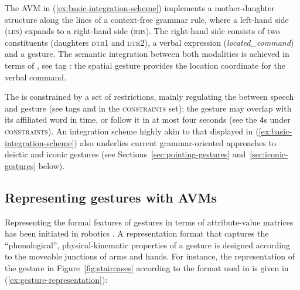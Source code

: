\documentclass[output=paper,biblatex,babelshorthands,newtxmath,draftmode,colorlinks,citecolor=brown]{langscibook}
\begin{document}
\noindent The AVM in (\ref{ex:basic-integration-scheme}) implements a mother-daughter structure along the lines of a context-free grammar rule, where a left-hand side (\textsc{lhs}) expands to a right-hand side (\textsc{rhs}).
%
The right-hand side consists of two constituents (daughters \textsc{dtr1} and \textsc{dtr2}), a verbal expression (\textit{located\_command})  and a gesture.
%
The semantic integration between both modalities is achieved in terms of , see tag : 
%
the spatial gesture provides the location coordinate for the verbal command. 

The  is constrained by a set of restrictions, mainly regulating the  between speech and gesture (see tags  and  in the \textsc{constraints} set): 
%
the gesture may overlap with its affiliated word in time, or follow it in at most four seconds (see the \texttt{4}s under \textsc{constraints}).
%
An integration scheme highly akin to that displayed in (\ref{ex:basic-integration-scheme}) also underlies current grammar-oriented approaches to deictic and iconic gestures (see Sections~\ref{sec:pointing-gestures} and~\ref{sec:iconic-gestures} below).



\subsection{Representing gestures with AVMs}
\label{sec:repr-gest-with}

Representing the formal features of gestures in terms of attribute-value matrices has been initiated in robotics \citep{Kopp:Tepper:Cassell:2004}. 
%
A representation format that captures the \enquote{phonological}, physical-kinematic properties of a gesture is designed according to the moveable junctions of arms and hands.
%
For instance, the representation of the gesture in Figure~\ref{fig:staircases} according to the format used in \citet{Luecking:Bergmann:Hahn:Kopp:Rieser:2010} is given in (\ref{ex:gesture-representation}):

\ea \label{ex:gesture-representation}
\z
\end{document}
